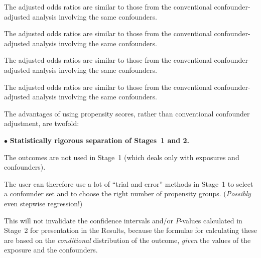 The adjusted odds ratios are similar to those from the conventional confounder-adjusted analysis
involving the same confounders.

\vfill\eject
\vfill


\centerline{
}

The adjusted odds ratios are similar to those from the conventional confounder-adjusted analysis
involving the same confounders.

\vfill\eject
\vfill


\centerline{
}

The adjusted odds ratios are similar to those from the conventional confounder-adjusted analysis
involving the same confounders.

\vfill\eject
\vfill


\centerline{
}

The adjusted odds ratios are similar to those from the conventional confounder-adjusted analysis
involving the same confounders.

\vfill\eject
\vfill


The advantages of using propensity scores, rather than conventional confounder adjustment,
are twofold:

\beginitems

\item{$\bullet$} {\bf Statistically rigorous separation of Stages~1 and 2.}

\itemitem{$-$} The outcomes are not used in Stage~1 (which deals only with exposures and confounders).

\itemitem{$-$} The user can therefore use a lot of ``trial and error'' methods in Stage~1
to select a confounder set and
to choose the right number of propensity groups. ({\it Possibly} even stepwise regression!)

\itemitem{$-$} This will not
invalidate the confidence intervals and/or $P$-values calculated in Stage~2 for presentation
in the Results, because the formulae for calculating these are based on the {\it conditional}
distribution of the outcome, {\it given} the values of the exposure and the confounders.

